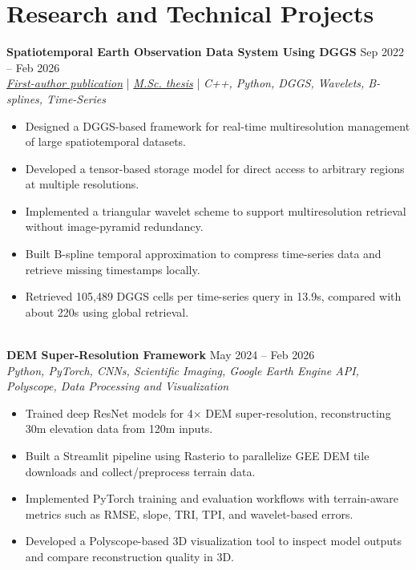 \documentclass[a4paper,10pt]{article}
\begin{document}

\section*{Research and Technical Projects}

\noindent
\textbf{Spatiotemporal Earth Observation Data System Using DGGS} \hfill Sep 2022 -- Feb 2026 \\
\textit{\href{https://doi.org/10.3390/rs17040570}{First-author publication}} | \textit{\href{https://ucalgary.scholaris.ca/items/114b394b-e516-4732-bd3a-45dd6160d480}{M.Sc. thesis}} | \textit{C++, Python, DGGS, Wavelets, B-splines, Time-Series}
\begin{itemize}[leftmargin=0.25in]
    \item Designed a DGGS-based framework for real-time multiresolution management of large spatiotemporal datasets.
    \item Developed a tensor-based storage model for direct access to arbitrary regions at multiple resolutions.
    \item Implemented a triangular wavelet scheme to support multiresolution retrieval without image-pyramid redundancy.
    \item Built B-spline temporal approximation to compress time-series data and retrieve missing timestamps locally.
    \item Retrieved 105,489 DGGS cells per time-series query in 13.9s, compared with about 220s using global retrieval.
\end{itemize}

\noindent \\
\textbf{DEM Super-Resolution Framework} \hfill May 2024 -- Feb 2026 \\
\textit{Python, PyTorch, CNNs, Scientific Imaging, Google Earth Engine API, Polyscope, Data Processing and Visualization}
\begin{itemize}[leftmargin=0.25in]
    \item Trained deep ResNet models for 4$\times$ DEM super-resolution, reconstructing 30m elevation data from 120m inputs.
    \item Built a Streamlit pipeline using Rasterio to parallelize GEE DEM tile downloads and collect/preprocess terrain data.
    \item Implemented PyTorch training and evaluation workflows with terrain-aware metrics such as RMSE, slope, TRI, TPI, and wavelet-based errors.
    \item Developed a Polyscope-based 3D visualization tool to inspect model outputs and compare reconstruction quality in 3D.
\end{itemize}
\end{document}
